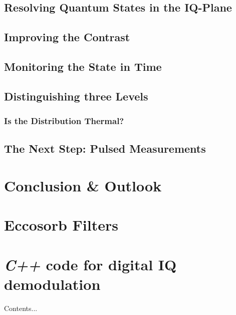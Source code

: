 \documentclass[twoside]{extarticle}
\begin{document}
\subsection{Resolving Quantum States in the IQ-Plane}
\label{sec:quantum_jumps:resolving_quantum_states_in_the_iq_plane}

\FloatBarrier


\subsection{Improving the Contrast}
\label{sec:quantum_jumps:improving_the_contrast}

\FloatBarrier

\subsection{Monitoring the State in Time}
\label{sec:quantum_jumps:monitoring_the_state_in_time}

\FloatBarrier

\subsection{Distinguishing three Levels}
\subsubsection{Is the Distribution Thermal?}
\subsection{The Next Step: Pulsed Measurements}
\FloatBarrier





\newpage
\section{Conclusion \& Outlook}


\fancyhf{}
\thispagestyle{empty}



\newpage
\begin{appendices}


\section{Eccosorb Filters}

\section{\textit{C++} code for digital IQ demodulation}
Contents...


\end{appendices}

\newpage



\newpage



%
\end{document}

